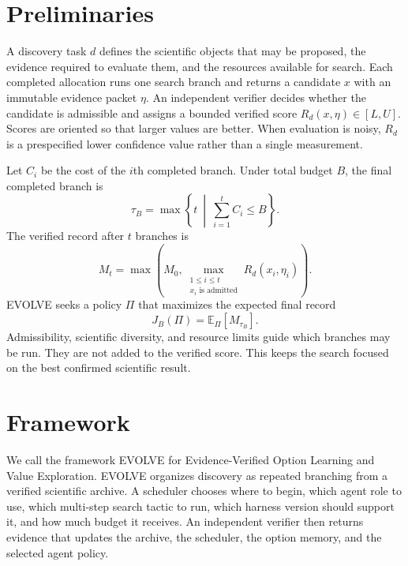 
\section{Preliminaries}
\label{secpreliminaries}

A discovery task $d$ defines the scientific objects that may be proposed, the evidence required to evaluate them, and the resources available for search. Each completed allocation runs one search branch and returns a candidate $x$ with an immutable evidence packet $\eta$. An independent verifier decides whether the candidate is admissible and assigns a bounded verified score $R_d(x,\eta)\in[L,U]$. Scores are oriented so that larger values are better. When evaluation is noisy, $R_d$ is a prespecified lower confidence value rather than a single measurement.

Let $C_i$ be the cost of the $i$th completed branch. Under total budget $B$, the final completed branch is
\begin{equation}
\tau_B
=
\max\left\{
t
\ \middle|\
\sum_{i=1}^{t}C_i\leq B
\right\}.
\label{eqstopping}
\end{equation}
The verified record after $t$ branches is
\begin{equation}
M_t
=
\max\left(
M_0,
\max_{\substack{1\leq i\leq t\\x_i\text{ is admitted}}}
R_d(x_i,\eta_i)
\right).
\label{eqrecord}
\end{equation}
EVOLVE seeks a policy $\Pi$ that maximizes the expected final record
\begin{equation}
J_B(\Pi)
=
\mathbb E_{\Pi}\left[M_{\tau_B}\right].
\label{eqobjective}
\end{equation}
Admissibility, scientific diversity, and resource limits guide which branches may be run. They are not added to the verified score. This keeps the search focused on the best confirmed scientific result.

\section{Framework}
\label{secframework}

We call the framework EVOLVE for Evidence-Verified Option Learning and Value Exploration. EVOLVE organizes discovery as repeated branching from a verified scientific archive. A scheduler chooses where to begin, which agent role to use, which multi-step search tactic to run, which harness version should support it, and how much budget it receives. An independent verifier then returns evidence that updates the archive, the scheduler, the option memory, and the selected agent policy.

